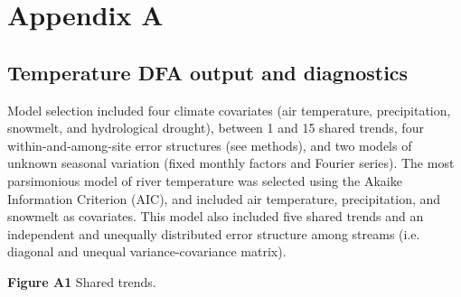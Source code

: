 \documentclass[notitlepage]{article}
\begin{document}


\clearpage

\section*{Appendix A}

\subsection*{Temperature DFA output and diagnostics}
Model selection included four climate covariates (air temperature, precipitation, snowmelt, and hydrological drought), between 1 and 15 shared trends, four within-and-among-site error structures (see methods), and two models of unknown seasonal variation (fixed monthly factors and Fourier series). The most parsimonious model of river temperature was selected using the Akaike Information Criterion (AIC), and included air temperature, precipitation, and snowmelt as covariates. This model also included five shared trends and an independent and unequally distributed error structure among streams (i.e. diagonal and unequal variance-covariance matrix).

\begin{center}
\textbf{Figure A1} Shared trends.
\end{center}
\end{document}
